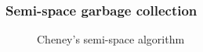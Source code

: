 \begin{frame}
  \frametitle{Semi-space garbage collection}
  \begin{figure}
    \centering
    
    \caption{Cheney's semi-space algorithm}
  \end{figure}
\end{frame}
